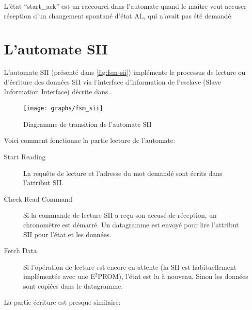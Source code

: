 \documentclass[a4paper,12pt,BCOR6mm,bibtotoc,idxtotoc]{scrbook}
\begin{document}
L'\'etat ``start\_ack'' est un raccourci dans l'automate quand le
ma\^itre veut accuser r\'eception d'un changement spontan\'e d'\'etat
AL, qui n'avait pas \'et\'e demand\'e.


\section{L'automate SII}
\label{sec:fsm-sii}

L'automate SII (pr\'esent\'e dans \autoref{fig:fsm-sii})
impl\'emente le processus de lecture ou d'\'ecriture des donn\'ees
SII via l'interface d'information de l'esclave (Slave Information
Interface) d\'ecrite dans \cite[sec.~6.4]{dlspec}.

\begin{figure}[htbp]
  \centering
  \texttt{[image: graphs/fsm\_sii]}
  \caption{Diagramme de transition de l'automate SII}
  \label{fig:fsm-sii}
\end{figure}

Voici comment fonctionne la partie lecture de l'automate:

\begin{description}

\item[Start Reading] La requ\^ete de lecture et l'adresse du
  mot demand\'e sont \'ecrits dans l'attribut SII.

\item[Check Read Command] Si la commande de lecture SII a re\c{c}u son
  accus\'e de r\'eception, un chronom\`etre est d\'emarr\'e. Un
  datagramme est envoy\'e pour lire l'attribut SII pour l'\'etat et
  les donn\'ees.

\item[Fetch Data] Si l'op\'eration de lecture est encore en attente
  (la SII est habituellement impl\'ement\'ee avec une E$^2$PROM),
  l'\'etat est lu \`a nouveau. Sinon les donn\'ees sont copi\'ees dans
  le datagramme.

\end{description}

La partie \'ecriture est presque similaire:
\end{document}
